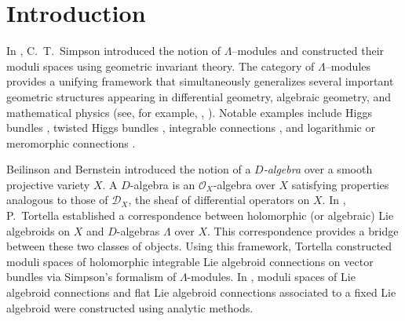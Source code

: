 \documentclass[12pt,reqno]{amsart}
\numberwithin{equation}{subsection}
\theoremstyle{definition}
\theoremstyle{theorem}
\begin{document}
	\baselineskip=15.5pt 
	
	\date{Last updated on \today\,at \currenttime\,(IST)}
	
	\maketitle 
	
    \begin{center}
		\small
		\tableofcontents
	\end{center}

	
	
	

	
	

\section{Introduction}\label{sec:introduction}

In \cite{CT.Simpson-1994}, C.~T.~Simpson introduced the notion of $\Lambda$--modules and constructed their moduli spaces using geometric invariant theory. 
The category of $\Lambda$--modules provides a unifying framework that simultaneously generalizes several important geometric structures appearing in differential geometry, algebraic geometry, and mathematical physics (see, for example, \cite{Cortes-Martinez-2004}, \cite{Lazzarini-Masson-2012}). 
Notable examples include Higgs bundles \cite{N.J.Hitchin-1987,CT. Simpson-1992,CT.Simpson-1995}, twisted Higgs bundles \cite{N.Nitsure-1991}, integrable connections \cite{CT. Simpson-1992}, and logarithmic or meromorphic connections \cite{P.Deligne-1970,N.Nitsure-1993,P.Boalch-2002,Bremer-Sage-2012}.

Beilinson and Bernstein \cite{Beilinson-Bernstein-1993} introduced the notion of a \textit{\(D\)-algebra} over a smooth projective variety \(X\). A \(D\)-algebra is an \(\mathcal{O}_{X}\)-algebra over \(X\) satisfying properties analogous to those of \(\mathcal{D}_{X}\), the sheaf of differential operators on \(X\). In \cite{P.Tortella-2011,P.Tortella-2011T}, P.~Tortella established a correspondence between holomorphic (or algebraic) Lie algebroids on $X$ and \(D\)-algebras \(\Lambda\) over \(X\). This correspondence provides a bridge between these two classes of objects. Using this framework, Tortella constructed moduli spaces of holomorphic integrable Lie algebroid connections on vector bundles via Simpson’s formalism of \(\Lambda\)-modules.
In \cite{K.Libor-2009,K.Libor-2010}, moduli spaces of Lie algebroid connections and flat Lie algebroid connections associated to a fixed Lie algebroid were constructed using analytic methods.
\end{document}
